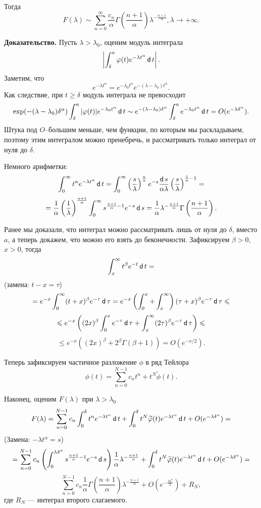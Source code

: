 Тогда
\[
    F(\lambda) \sim \sum_{n=0}^{\infty} \frac{c_n}{\alpha} \Gamma \left( \frac{n+1}{\alpha} \right) \lambda^{-\frac{n+1}{\alpha}}, \lambda \to +\infty.
\]

\textbf{Доказательство.} Пусть $\lambda > \lambda_0$, оценим модуль интеграла
\[
    \left| \int_\delta^a \varphi(t) e^{-\lambda t^\alpha} \operatorname{\mathsf d} t \right|.
\]
Заметим, что
\[
    e^{-\lambda t^\alpha} = e^{-\lambda_0 t^\alpha} e^{-(\lambda - \lambda_0) t^\alpha}.
\]
Как следствие, при $t \ge \delta$ модуль интеграла не превосходит
\[
    \exp(-(\lambda - \lambda_0) \delta^\alpha) \int_\delta^a |\varphi(t)| e^{-\lambda_0 t^\alpha} \operatorname{\mathsf d} t \sim e^{-(\lambda - \lambda_0) \delta^\alpha} \int_\delta^a e^{-\lambda_0 t^\alpha} \operatorname{\mathsf d} t = O(e^{-\lambda \delta^\alpha}).
\]
Штука под $O$--большим меньше, чем функции, по которым мы раскладываем, поэтому этим интегралом можно пренебречь, и рассматривать только интеграл от нуля до $\delta$.

Немного арифметки:
\[
    \int_0^\infty t^n e^{-\lambda t^\alpha} \operatorname{\mathsf d} t = \int_0^\infty \left( \frac{s}{\lambda} \right)^{\frac{n}{\alpha}} e^{-s} \frac{\operatorname{\mathsf d} s}{\alpha \lambda} \left( \frac{s}{\lambda} \right)^{\frac{1}{\alpha} - 1} =
\]
\[
    = \frac{1}{\alpha} \left( \frac{1}{\lambda} \right)^{\frac{n+1}{\alpha}} \int_0^\infty s^{\frac{n+1}{\alpha} - 1} e^{-s} \operatorname{\mathsf d} s = \frac{1}{\alpha} \lambda^{-\frac{n+1}{\alpha}} \Gamma \left( \frac{n+1}{\alpha} \right).
\]

Ранее мы доказали, что интеграл можно рассматривать лишь от нуля до $\delta$, вместо $a$, а теперь докажем, что можно его взять до беконечности.
Зафиксируем $\beta > 0$, $x > 0$, тогда
\[
    \int_x^\infty t^\beta e^{-t} \operatorname{\mathsf d} t =
\]
(замена: $t - x = \tau$)
\[
    = e^{-x} \int_0^\infty (t + x)^\beta e^{-\tau} \operatorname{\mathsf d} \tau = e^{-x} \left( \int_0^x + \int_x^{\infty} \right) (\tau + x)^\beta e^{-\tau} \operatorname{\mathsf d} \tau \leqslant
\]
\[
    \leqslant e^{-x} \left((2x)^\beta \int_0^x e^{-\tau} \operatorname{\mathsf d} \tau + \int_x^{\infty} (2\tau)^\beta e^{-\tau} \operatorname{\mathsf d} \tau \right) \leqslant 
\]
\[
    \le e^{-x} ((2x)^\beta + 2^\beta \Gamma(\beta + 1)) = O(e^{-x/2}).
\]

Теперь зафиксируем частичное разложение $\phi$ в ряд Тейлора
\[
    \phi(t) = \sum_{n=0}^{N-1} c_n t^n + t^N \widetilde \phi(t).
\]

Наконец, оценим $F(\lambda)$ при $\lambda > \lambda_0$
\[
    F(\lambda) = \sum_{n=0}^{N-1} c_n \int_0^\delta t^n e^{-\lambda t^\alpha} \operatorname{\mathsf d} t + \int_0^\delta t^N \widetilde {\varphi}(t) e^{-\lambda t^\alpha} \operatorname{\mathsf d} t + O(e^{-\lambda \delta^\alpha}) =
\]
(Замена: $-\lambda t^\alpha = s$)
\[
    = \sum_{n=0}^{N-1} c_n \left( \int_0^{\lambda \delta^\alpha} s^{\frac{n+1}{\alpha} - 1} e^{-s} \operatorname{\mathsf d} s \right) \frac{1}{\alpha} \lambda^{-\frac{n+1}{\alpha}} + \int_0^\delta t^N \widetilde {\varphi}(t) e^{-\lambda t^\alpha} \operatorname{\mathsf d} t + O(e^{-\lambda \delta^\alpha}) =
\]
\[
    \sum_{n=0}^{N-1} c_n \frac{1}{\alpha} \Gamma \left( \frac{n+1}{\alpha} \right) \lambda^{-\frac{n+1}{\alpha}} + O \left(e^{-\frac{\lambda \delta^\alpha}{2}} \right) + R_N,
\]
где $R_N$ --- интеграл второго слагаемого.

